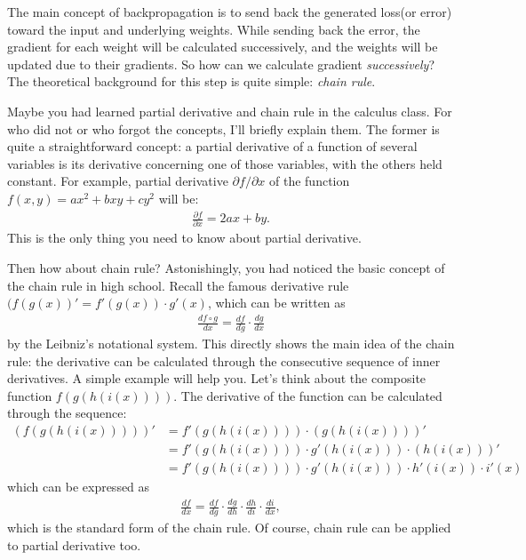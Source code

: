 \documentclass{oblivoir}
\begin{document}
The main concept of backpropagation is to send back the generated loss(or error) toward the input and underlying weights. While sending back the error, the gradient for each weight will be calculated successively, and the weights will be updated due to their gradients. So how can we calculate gradient \textit{successively}? The theoretical background for this step is quite simple: \textit{chain rule}.

Maybe you had learned partial derivative and chain rule in the calculus class. For who did not or who forgot the concepts, I'll briefly explain them. The former is quite a straightforward concept: a partial derivative of a function of several variables is its derivative concerning one of those variables, with the others held constant. For example, partial derivative ${\partial f}/{\partial x}$ of the function $f(x,y) = ax^2 + bxy + cy^2$ will be:
\begin{align*}
    \frac{\partial f}{\partial x} = 2ax + by.
\end{align*}
This is the only thing you need to know about partial derivative. 

Then how about chain rule? Astonishingly, you had noticed the basic concept of the chain rule in high school. Recall the famous derivative rule $(f(g(x))' = f'(g(x)) \cdot g'(x)$, which can be written as
\begin{align*}
     \frac{df \circ g}{dx} = \frac{df}{dg} \cdot \frac{dg}{dx}
\end{align*}
by the Leibniz's notational system. This directly shows the main idea of the chain rule: the derivative can be calculated through the consecutive sequence of inner derivatives. A simple example will help you. Let's think about the composite function $f(g(h(i(x))))$. The derivative of the function can be calculated through the sequence:
\begin{align*}
    (f(g(h(i(x)))))' &= f'(g(h(i(x)))) \cdot (g(h(i(x))))' \\
                     &= f'(g(h(i(x)))) \cdot g'(h(i(x))) \cdot (h(i(x)))' \\
                     &= f'(g(h(i(x)))) \cdot g'(h(i(x))) \cdot h'(i(x)) \cdot i'(x)
\end{align*}
which can be expressed as 
\begin{align*}
    \frac{df}{dx} = \frac{df}{dg} \cdot \frac{dg}{dh} \cdot \frac{dh}{di} \cdot \frac{di}{dx},
\end{align*}
which is the standard form of the chain rule. Of course, chain rule can be applied to partial derivative too.
\end{document}

